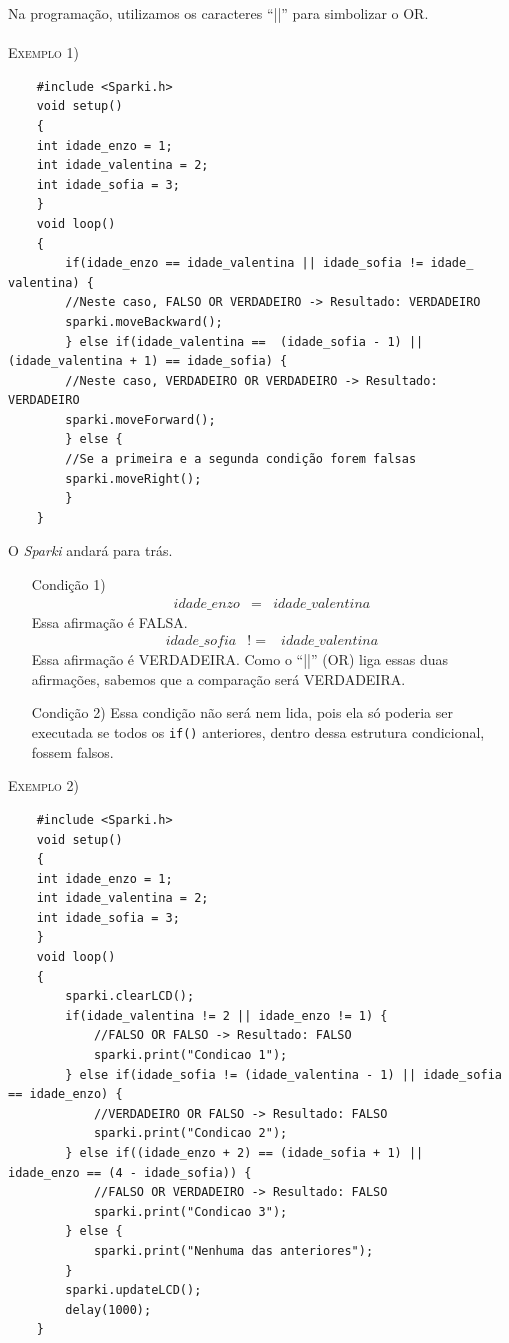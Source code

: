     Na programação, utilizamos os caracteres ``||'' para simbolizar o OR.
    \\
    \\
    \textsc{Exemplo 1)}
     
     \begin{verbatim}
    #include <Sparki.h>
    void setup()
    {
    int idade_enzo = 1;
    int idade_valentina = 2;
    int idade_sofia = 3;
    }
    void loop()
    {
        if(idade_enzo == idade_valentina || idade_sofia != idade_ valentina) {
        //Neste caso, FALSO OR VERDADEIRO -> Resultado: VERDADEIRO
        sparki.moveBackward();
        } else if(idade_valentina ==  (idade_sofia - 1) || (idade_valentina + 1) == idade_sofia) {
        //Neste caso, VERDADEIRO OR VERDADEIRO -> Resultado: VERDADEIRO
        sparki.moveForward();
        } else {
        //Se a primeira e a segunda condição forem falsas
        sparki.moveRight();
        }
    }
    \end{verbatim}
    
    O \textsl{Sparki} andará para trás.
    \begin{itemize}
        \item[Condição 1)] 
        \begin{eqnarray}
        idade\_enzo & = & idade\_valentina
        \end{eqnarray}
        Essa afirmação é FALSA.
        \begin{eqnarray}
        idade\_sofia & != & idade\_valentina
        \end{eqnarray}
        Essa afirmação é VERDADEIRA. Como o ``||'' (OR) liga essas duas afirmações, sabemos que a comparação será VERDADEIRA.
        \item[Condição 2)] Essa condição não será nem lida, pois ela só poderia ser executada se todos os \texttt{if()} anteriores, dentro dessa estrutura condicional, fossem falsos.
    \end{itemize}

    \textsc{Exemplo 2)}
     
    \begin{verbatim}
    #include <Sparki.h>
    void setup()
    {
    int idade_enzo = 1;
    int idade_valentina = 2;
    int idade_sofia = 3;
    }
    void loop()
    {
        sparki.clearLCD();
        if(idade_valentina != 2 || idade_enzo != 1) {
            //FALSO OR FALSO -> Resultado: FALSO
            sparki.print("Condicao 1");
        } else if(idade_sofia != (idade_valentina - 1) || idade_sofia == idade_enzo) {
            //VERDADEIRO OR FALSO -> Resultado: FALSO
            sparki.print("Condicao 2");
        } else if((idade_enzo + 2) == (idade_sofia + 1) ||     idade_enzo == (4 - idade_sofia)) {
            //FALSO OR VERDADEIRO -> Resultado: FALSO
            sparki.print("Condicao 3");
        } else {
            sparki.print("Nenhuma das anteriores");
        }
        sparki.updateLCD();
        delay(1000);
    }
    \end{verbatim}
    

